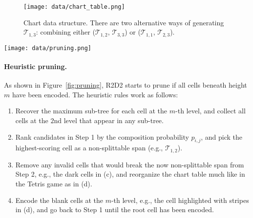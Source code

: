 \begin{figure}[htb!]
  \centering
  \texttt{[image: data/chart\_table.png]}
  \caption{Chart data structure. There are two alternative ways of generating $\mathcal{T}_{1,3}$:
     combining either ($\mathcal{T}_{1,2}$, $\mathcal{T}_{3,3}$) or ($\mathcal{T}_{1,1}$, $\mathcal{T}_{2,3}$).}
  \label{fig:chart_data}
\end{figure}


\begin{figure*}[htb!]
    \flushleft
    \texttt{[image: data/pruning.png]}
    \vspace{-3ex}
    \caption{Example of chart pruning and encoding process. With R2D2's original heuristic pruning, cells to merge are selected according to local composition probabilities. For better model-based pruning, we propose selecting cells according to the merge order estimated by a top-down parser.}\vspace{-1ex}
    \label{fig:pruning}
\end{figure*}

\paragraph{Heuristic pruning.} 
%
As shown in Figure~\ref{fig:pruning}, R2D2 starts to prune if all cells beneath height $m$ have been encoded. 
The heuristic rules work as follows:
\begin{enumerate}
    \item Recover the maximum sub-tree for each cell at the $m$-th level, and collect all cells at the $2$nd level that appear in any sub-tree.
    \item Rank candidates in Step 1 by the composition probability $p_{i, j}$, and pick the highest-scoring cell as a non-splittable span (e.g., $\mathcal{T}_{1,2}$).
    \item Remove any invalid cells that would break the now non-splittable span from Step 2, e.g., the dark cells in (c), and reorganize the chart table much like in the Tetris game as in (d).
    \item Encode the blank cells at the $m$-th level, e.g., the cell highlighted with stripes in (d), and go back to Step 1 until the root cell has been encoded.
\end{enumerate}

